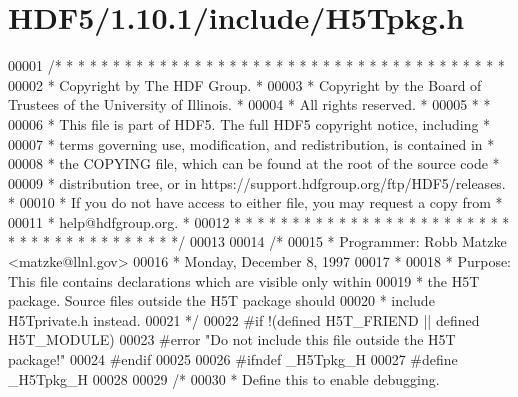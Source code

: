 \hypertarget{_h_d_f5_21_810_81_2include_2_h5_tpkg_8h_source}{}\section{H\+D\+F5/1.10.1/include/\+H5\+Tpkg.h}
\label{_h_d_f5_21_810_81_2include_2_h5_tpkg_8h_source}

\begin{DoxyCode}
00001 \textcolor{comment}{/* * * * * * * * * * * * * * * * * * * * * * * * * * * * * * * * * * * * * * *}
00002 \textcolor{comment}{ * Copyright by The HDF Group.                                               *}
00003 \textcolor{comment}{ * Copyright by the Board of Trustees of the University of Illinois.         *}
00004 \textcolor{comment}{ * All rights reserved.                                                      *}
00005 \textcolor{comment}{ *                                                                           *}
00006 \textcolor{comment}{ * This file is part of HDF5.  The full HDF5 copyright notice, including     *}
00007 \textcolor{comment}{ * terms governing use, modification, and redistribution, is contained in    *}
00008 \textcolor{comment}{ * the COPYING file, which can be found at the root of the source code       *}
00009 \textcolor{comment}{ * distribution tree, or in https://support.hdfgroup.org/ftp/HDF5/releases.  *}
00010 \textcolor{comment}{ * If you do not have access to either file, you may request a copy from     *}
00011 \textcolor{comment}{ * help@hdfgroup.org.                                                        *}
00012 \textcolor{comment}{ * * * * * * * * * * * * * * * * * * * * * * * * * * * * * * * * * * * * * * */}
00013 
00014 \textcolor{comment}{/*}
00015 \textcolor{comment}{ * Programmer:  Robb Matzke <matzke@llnl.gov>}
00016 \textcolor{comment}{ *      Monday, December  8, 1997}
00017 \textcolor{comment}{ *}
00018 \textcolor{comment}{ * Purpose: This file contains declarations which are visible only within}
00019 \textcolor{comment}{ *      the H5T package.  Source files outside the H5T package should}
00020 \textcolor{comment}{ *      include H5Tprivate.h instead.}
00021 \textcolor{comment}{ */}
00022 \textcolor{preprocessor}{#if !(defined H5T\_FRIEND || defined H5T\_MODULE)}
00023 \textcolor{preprocessor}{#error "Do not include this file outside the H5T package!"}
00024 \textcolor{preprocessor}{#endif}
00025 
00026 \textcolor{preprocessor}{#ifndef \_H5Tpkg\_H}
00027 \textcolor{preprocessor}{#define \_H5Tpkg\_H}
00028 
00029 \textcolor{comment}{/*}
00030 \textcolor{comment}{ * Define this to enable debugging.}

\end{DoxyCode}
